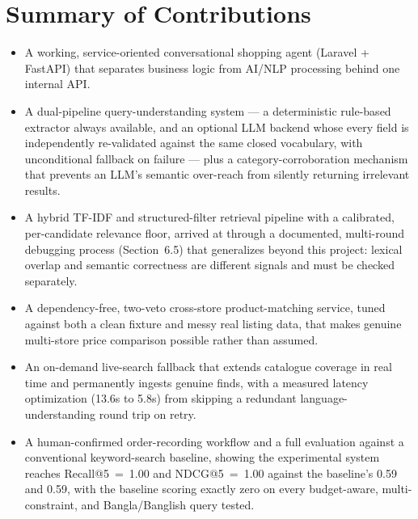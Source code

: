 \documentclass[12pt,a4paper]{report}
\begin{document}
\section{Summary of Contributions}
\begin{itemize}
\item A working, service-oriented conversational shopping agent (Laravel + FastAPI) that separates
business logic from AI/NLP processing behind one internal API.
\item A dual-pipeline query-understanding system --- a deterministic rule-based extractor always
available, and an optional LLM backend whose every field is independently re-validated against the same
closed vocabulary, with unconditional fallback on failure --- plus a category-corroboration mechanism that
prevents an LLM's semantic over-reach from silently returning irrelevant results.
\item A hybrid TF-IDF and structured-filter retrieval pipeline with a calibrated, per-candidate relevance
floor, arrived at through a documented, multi-round debugging process (Section~6.5) that generalizes
beyond this project: lexical overlap and semantic correctness are different signals and must be checked
separately.
\item A dependency-free, two-veto cross-store product-matching service, tuned against both a clean fixture
and messy real listing data, that makes genuine multi-store price comparison possible rather than assumed.
\item An on-demand live-search fallback that extends catalogue coverage in real time and permanently
ingests genuine finds, with a measured latency optimization (13.6s to 5.8s) from skipping a redundant
language-understanding round trip on retry.
\item A human-confirmed order-recording workflow and a full evaluation against a conventional
keyword-search baseline, showing the experimental system reaches Recall@5~=~1.00 and NDCG@5~=~1.00 against
the baseline's 0.59 and 0.59, with the baseline scoring exactly zero on every budget-aware,
multi-constraint, and Bangla/Banglish query tested.
\end{itemize}
\end{document}
